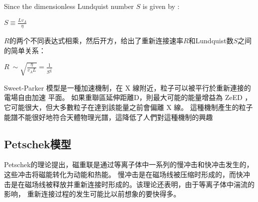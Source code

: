 \documentclass[12pt, a4paper, oneside]{article}
\begin{document}
\begin{spacing}{2.0}
Since the dimensionless Lundquist number $S$ is given by
: 
\begin{center}
    $\displaystyle S \equiv \frac{Lv_A}{\eta}$
\end{center}
$R$的两个不同表达式相乘，然后开方，给出了重新连接速率$R$和Lundquist数$S$之间的简单关系：
\begin{center}
    $\displaystyle R ~ \sim \sqrt{\frac{\eta}{v_A L}} = \frac{1}{S^\frac{1}{2}}$
\end{center}
Sweet-Parker 模型是一種加速機制，在 X 線附近，粒子可以被平行於重新連接的電場自由加速
平面。 如果重聯區延伸距離D，則最大可能的能量增益為 ZeED ，它可能很大，但大多數粒子在達到該能量之前會偏離 X 線。 
這種機制產生的粒子能譜不能很好地符合天體物理光譜，這降低了人們對這種機制的興趣\cite{zweibel2009magnetic}

\subsection{Petschek模型}

Petschek的理论提出，磁重联是通过等离子体中一系列的慢冲击和快冲击发生的，这些冲击将磁能转化为动能和热能。
慢冲击是在磁场线被压缩时形成的，而快冲击是在磁场线被释放并重新连接时形成的。该理论还表明，由于等离子体中湍流的影响，
重新连接过程的发生可能比以前想象的要快得多。


\end{spacing}
\end{document}
